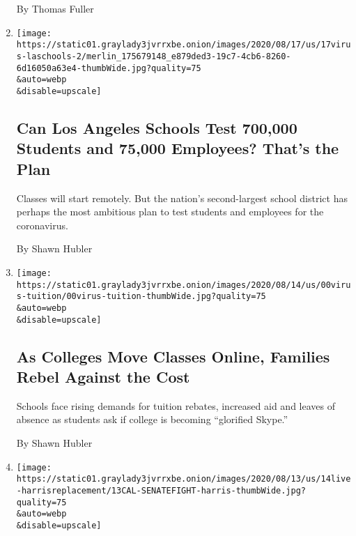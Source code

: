 \begin{enumerate}
  By Thomas Fuller
\item
  \href{/2020/08/16/us/los-angeles-schools-virus-testing.html}{}

  \texttt{[image: https://static01.graylady3jvrrxbe.onion/images/2020/08/17/us/17virus-laschools-2/merlin\_175679148\_e879ded3-19c7-4cb6-8260-6d16050a63e4-thumbWide.jpg?quality=75\\\&auto=webp\\\&disable=upscale]}

  \hypertarget{can-los-angeles-schools-test-700000-students-and-75000-employees-thats-the-plan}{%
  \subsection{Can Los Angeles Schools Test 700,000 Students and 75,000
  Employees? That's the
  Plan}\label{can-los-angeles-schools-test-700000-students-and-75000-employees-thats-the-plan}}

  Classes will start remotely. But the nation's second-largest school
  district has perhaps the most ambitious plan to test students and
  employees for the coronavirus.

  By Shawn Hubler
\item
  \href{/2020/08/15/us/covid-college-tuition.html}{}

  \texttt{[image: https://static01.graylady3jvrrxbe.onion/images/2020/08/14/us/00virus-tuition/00virus-tuition-thumbWide.jpg?quality=75\\\&auto=webp\\\&disable=upscale]}

  \hypertarget{as-colleges-move-classes-online-families-rebel-against-the-cost}{%
  \subsection{As Colleges Move Classes Online, Families Rebel Against
  the
  Cost}\label{as-colleges-move-classes-online-families-rebel-against-the-cost}}

  Schools face rising demands for tuition rebates, increased aid and
  leaves of absence as students ask if college is becoming ``glorified
  Skype.''

  By Shawn Hubler
\item
  \href{/2020/08/14/us/who-from-california-would-replace-kamala-harris-in-the-senate.html}{}

  \texttt{[image: https://static01.graylady3jvrrxbe.onion/images/2020/08/13/us/14live-harrisreplacement/13CAL-SENATEFIGHT-harris-thumbWide.jpg?quality=75\\\&auto=webp\\\&disable=upscale]}

  \hypertarget{who-from-california-would-replace-kamala-harris-in-the-senate}{%
}
\end{enumerate}
